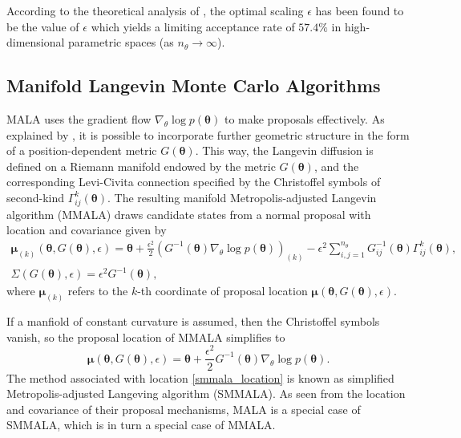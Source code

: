 \documentclass[twoside,11pt]{article}
\begin{document}
According to the theoretical analysis of \cite{rob_ros__opt}, the optimal scaling $\epsilon$ has been found to be the value 
of $\epsilon$ which yields a limiting acceptance rate of $57.4\%$ in high-dimensional parametric spaces 
(as $n_{\theta}\rightarrow\infty$).

\subsection{Manifold Langevin Monte Carlo Algorithms}
\label{smmala_section}

MALA uses the gradient flow $\nabla_{\theta}\log{p(\boldsymbol{\theta})}$ to make proposals effectively.
As explained by \cite{gir_cal__rie}, it is possible to incorporate further geometric structure in the form of a 
position-dependent metric $G(\boldsymbol{\theta})$.
This way, the Langevin diffusion is defined on a Riemann manifold endowed by the metric $G(\boldsymbol{\theta})$, and the
corresponding Levi-Civita connection specified by the Christoffel symbols of second-kind 
$\Gamma^{k}_{ij}(\boldsymbol{\theta})$. The resulting manifold Metropolis-adjusted Langevin algorithm (MMALA) draws 
candidate states from a normal proposal with location and covariance given by
\begin{eqnarray}
\label{mmala_location}
\boldsymbol{\mu}_{(k)}(\boldsymbol{\theta}, G(\boldsymbol{\theta}), \epsilon) =
\boldsymbol{\theta}+
\frac{\epsilon^2}{2}(G^{-1}(\boldsymbol{\theta})\nabla_{\theta}\log{p(\boldsymbol{\theta})})_{(k)}-
\epsilon^2\sum_{i,j=1}^{n_\theta}G^{-1}_{ij}(\boldsymbol{\theta})\Gamma^{k}_{ij}(\boldsymbol{\theta}),\\
\label{mmala_covariance}
\Sigma(G(\boldsymbol{\theta}), \epsilon) = \epsilon^2 G^{-1}(\boldsymbol{\theta}),
\end{eqnarray}
where $\boldsymbol{\mu}_{(k)}$ refers to the $k$-th coordinate of proposal location
$\boldsymbol{\mu}(\boldsymbol{\theta}, G(\boldsymbol{\theta}), \epsilon)$.

If a manfiold of constant curvature is assumed, then the Christoffel symbols vanish, so the proposal location of MMALA
simplifies to
\begin{equation}
\label{smmala_location}
\boldsymbol{\mu}(\boldsymbol{\theta}, G(\boldsymbol{\theta}), \epsilon) =
\boldsymbol{\theta}+
\frac{\epsilon^2}{2}G^{-1}(\boldsymbol{\theta})\nabla_{\theta}\log{p(\boldsymbol{\theta})}.
\end{equation}
The method associated with location \eqref{smmala_location} is known as simplified Metropolis-adjusted Langeving algorithm
(SMMALA). As seen from the location and covariance of their proposal mechanisms, MALA is a special case of SMMALA, which is 
in turn a special case of MMALA.
\end{document}
